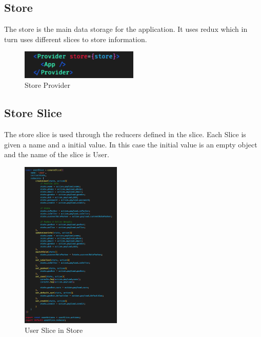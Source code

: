     \pagebreak

    \subsection{Store}
    The store is the main data storage for the application. It uses redux which in turn uses different slices to store information.
    \begin{figure}[h]
        \centering
        \includegraphics[width=0.5\textwidth]{images/redux_store.png}
        \caption{Store Provider}
        \label{fig:redux_store}
    \end{figure}


    \subsection{Store Slice}
    The store slice is used through the reducers defined in the slice. Each Slice is given a name and a initial value. In this case the initial value is an empty object and the name of the slice is User. 
    \begin{figure}[h]
        \centering
        \includegraphics[width=0.425\textwidth]{images/storeSlice.png}
        \caption{User Slice in Store}
        \label{fig:storeSlice}
    \end{figure}

    \pagebreak


